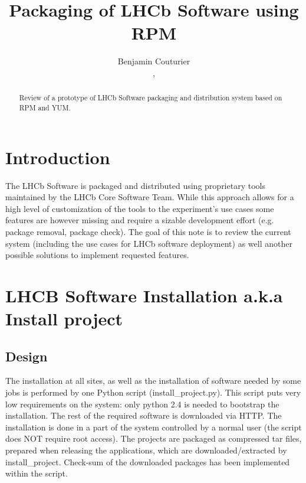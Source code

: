 \documentclass{lhcbnote}
\title{Packaging of LHCb Software using RPM}
\author{Benjamin Couturier{\address[BGADD]{CERN,Switzerland}},}
\begin{document}
\maketitle

\begin{abstract}
Review of a prototype of LHCb Software packaging and distribution system based on RPM and YUM.
\end{abstract}

\begin{status}
\end{status}

\tableofcontents


\pagebreak

\section{Introduction}
The LHCb Software is packaged and distributed using proprietary tools maintained by the LHCb Core Software Team. While this approach allows for a high level of customization of the tools to the experiment's use cases some features are however missing and require a sizable development effort (e.g. package removal, package check). The goal of this note is to review the current system (including the use cases for LHCb software deployment) as well another possible solutions to implement requested features.

\section{LHCB Software Installation a.k.a Install project}

\subsection{Design}

The installation at all sites, as well as the installation of software needed by some jobs is performed by one Python script (install\_project.py).
This script puts very low requirements on the system: only python 2.4 is needed to bootstrap the installation. The rest of the required software is downloaded via HTTP. 
The installation is done in a part of the system controlled by a normal user (the script does NOT require root access).
The projects are packaged as compressed tar files, prepared when releasing the applications, which are downloaded/extracted by install\_project. 
Check-sum of the downloaded packages has been implemented within the script.
\end{document}
